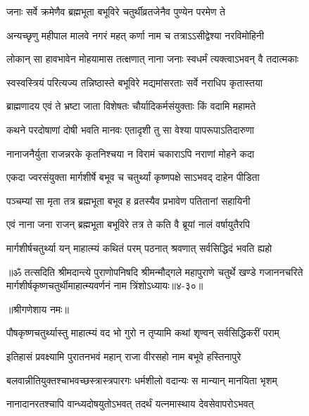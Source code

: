 \twolineshloka
{जनाः सर्वे क्रमेणैव ब्रह्मभूता बभूविरे}
{चतुर्थीव्रतजेनैव पुण्येन परमेण ते} %

\twolineshloka
{अन्यच्छृणु महीपाल मालवे नगरं महत्}
{कर्णा नाम च तत्राऽऽसीद्वेश्या नरविमोहिनी} %

\twolineshloka
{लोकान् सा हावभावेन मोहयामास तत्क्षणात्}
{नाना जनाः स्वधर्मं त्यक्त्वाऽभवन् वै तदात्मकाः} %

\twolineshloka
{स्वस्वस्त्रियं परित्यज्य तन्निष्ठास्ते बभूविरे}
{मद्यमांसरताः सर्वे नराधिप कृतास्तया} %

\twolineshloka
{ब्राह्मणादय एवं ते भ्रष्टा जाता विशेषतः}
{चौर्यादिकर्मसंयुक्ताः किं वदामि महामते} %

\twolineshloka
{कथने परदोषाणां दोषी भवति मानवः}
{एतादृशी तु सा वेश्या पापरूपाऽतिदारुणा} %

\twolineshloka
{नानाजनैर्युता राजन्नरके कृतनिश्चया}
{न विरामं चकाराऽपि नराणां मोहने कदा} %

\twolineshloka
{एकदा ज्वरसंयुक्ता मार्गशीर्षे बभूव च}
{चतुर्थ्यां कृष्णपक्षे साऽभवद् दाहेन पीडिता} %

\twolineshloka
{पञ्चम्यां सा मृता तत्र ब्रह्मभूता बभूव ह}
{व्रतस्यैव प्रभावेण पतितानां सहायिनी} %

\twolineshloka
{एवं नाना जना राजन् ब्रह्मभूता बभूविरे}
{तत्र ते कति वै ब्रूयां नालं वर्षायुतैरपि} %

\twolineshloka
{मार्गशीर्षचतुर्थ्या यन् माहात्म्यं कथितं परम्}
{पठनात् श्रवणात् सर्वसिद्धिदं भवति ह्यहो} %

॥ॐ तत्सदिति श्रीमदान्त्ये पुराणोपनिषदि श्रीमन्मौद्गले महापुराणे चतुर्थे खण्डे गजाननचरिते मार्गशीर्षकृष्णचतुर्थीमाहात्म्यवर्णनं नाम त्रिंशोऽध्यायः॥४-३०॥


\label{sec:pausha-krishna-chaturthi-mahatmya-varnanam}

\centerline{॥श्रीगणेशाय नमः॥}


\twolineshloka
{पौषकृष्णचतुर्थ्यास्तु माहात्म्यं वद भो गुरो}
{न तृप्यामि कथां श‍ृण्वन् सर्वसिद्धिकरीं पराम्} %


\twolineshloka
{इतिहासं प्रवक्ष्यामि पुरातनभवं महान्}
{राजा वीरसहो नाम बभूवे हस्तिनापुरे} %

\twolineshloka
{बलवान्नीतियुक्तश्चाभवच्छस्त्रास्त्रपारगः}
{धर्मशीलो वदान्यः स मान्यान् मानयिता भृशम्} %

\twolineshloka
{नानादानरतश्चापि वान्ध्यदोषयुतोऽभवत्}
{तदर्थं यत्नमास्थाय देवसेवापरोऽभवत्} %

